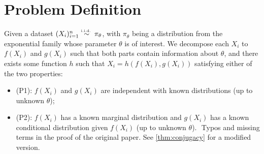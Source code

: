 \section{Problem Definition}\label{sec:problem_def}
Given a dataset $(X_i)_{i=1}^n \overset{\textrm{\tiny i.i.d.\ }}{\sim} \pi_\theta$, with $\pi_\theta$ being a distribution from the exponential family whose parameter $\theta$ is of interest. We decompose each $X_i$ to $f(X_i)$ and $g(X_i)$ such that both parts contain information about $\theta$, and there exists some function $h$ such that $X_i = h(f(X_i), g(X_i))$ satisfying either of the two properties:
\begin{itemize}
\item (P1): $f(X_i)$ and $g(X_i)$ are independent with known distributions (up to unknown $\theta$);
\item (P2): $f(X_i)$ has a known marginal distribution and $g(X_i)$ has a known conditional distribution given $f(X_i)$ (up to unknown $\theta$).
\newline $ $
\color{red}
Typos and missing terms in the proof of the original paper. See \cref{thm:conjugacy} for a modified version.
\color{black}
\end{itemize}